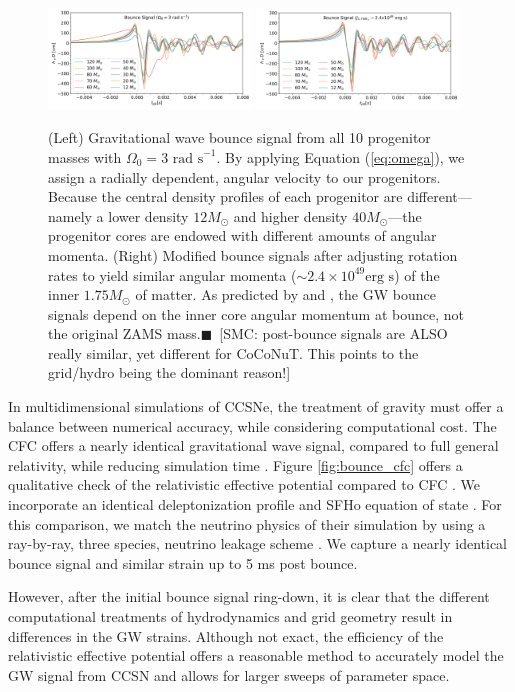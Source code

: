 \documentclass[twocolumn,times]{aastex62}  %
\newcommand{\smc}[1]{{\color{blue}$\blacksquare$~\textsf{[SMC: #1]}}}
\begin{document}
\begin{figure}[t]
  \centering     %
  \includegraphics[width=0.48\textwidth]{figures/hd3_bounce_test.pdf}
  \includegraphics[width=0.48\textwidth]{figures/hdj_bounce_final.pdf}
  \caption{(Left) Gravitational wave bounce signal from all 10 progenitor masses with $\Omega_0 = 3 \text{ rad s}^{-1}$.  By applying Equation (\ref{eq:omega}), we assign a radially dependent, angular velocity to our progenitors.  Because the central density profiles of each progenitor are different---namely a lower density $12 M_\odot$ and higher density $40 M_\odot$---the progenitor cores are endowed with different amounts of angular momenta.   (Right) Modified bounce signals after adjusting rotation rates to yield similar angular momenta ($\sim 2.4\times10^{49} \text{erg s}$) of the inner $1.75 M_\odot$ of matter.  As predicted by \citet{dimm:2008} and \citet{abdik:2010,abdik:2014}, the GW bounce signals depend on the inner core angular momentum at bounce, not the original ZAMS mass.\smc{post-bounce signals are ALSO really similar, yet different for CoCoNuT. This points to the grid/hydro being the dominant reason!}}
  \label{fig:bounce}
\end{figure}

In multidimensional simulations of CCSNe, the treatment of gravity must offer a balance between numerical accuracy, while considering computational cost.   The CFC offers a nearly identical gravitational wave signal, compared to full general relativity, while reducing simulation time \citep{ott:2007}.  Figure \ref{fig:bounce_cfc} offers a qualitative check of the relativistic effective potential compared to CFC \citep{richers:2017}.  We incorporate an identical deleptonization profile \citep{lieb:2005} and SFHo equation of state \citep{steiner:2013}.  For this comparison, we match the neutrino physics of their simulation by using a ray-by-ray, three species, neutrino leakage scheme \citep{oconnor:2010,couch:2014}.  We capture a nearly identical bounce signal and similar strain up to 5 ms post bounce. \par
However, after the initial bounce signal ring-down, it is clear that the different computational treatments of hydrodynamics and grid geometry result in differences in the GW strains.  Although not exact, the efficiency of the relativistic effective potential offers a reasonable method to accurately model the GW signal from CCSN and allows for larger sweeps of parameter space.
\end{document}
